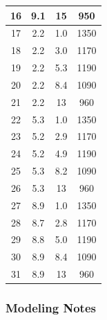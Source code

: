 \begin{table}[!ht]
\begin{tabular}{|c|c|c|c|}
16        &  9.1              &  15                         &  950                          \\ \hline
17        &  2.2              &  1.0                        &  1350                         \\ \hline
18        &  2.2              &  3.0                        &  1170                         \\ \hline
19        &  2.2              &  5.3                        &  1190                         \\ \hline
20        &  2.2              &  8.4                        &  1090                         \\ \hline
21        &  2.2              &  13                         &  960                          \\ \hline
22        &  5.3              &  1.0                        &  1350                         \\ \hline
23        &  5.2              &  2.9                        &  1170                         \\ \hline
24        &  5.2              &  4.9                        &  1190                         \\ \hline
25        &  5.3              &  8.2                        &  1090                         \\ \hline
26        &  5.3              &  13                         &  960                          \\ \hline
27        &  8.9              &  1.0                        &  1350                         \\ \hline
28        &  8.7              &  2.8                        &  1170                         \\ \hline
29        &  8.8              &  5.0                        &  1190                         \\ \hline
30        &  8.9              &  8.4                        &  1090                         \\ \hline
31        &  8.9              &  13                         &  960                          \\ \hline
\end{tabular}
\label{Sippola_Aerosol_Deposition_Summary}
\end{table}

\subsubsection{Modeling Notes}

